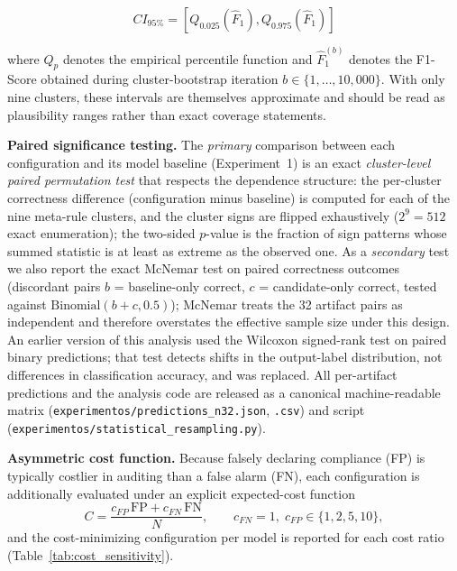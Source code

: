 \documentclass{ieeeaccess}
\begin{document}
\begin{equation}
CI_{95\%} = \left[
Q_{0.025}(\hat{F}_1),
Q_{0.975}(\hat{F}_1)
\right]
\label{eq:bootstrap_ci}
\end{equation}

where $Q_p$ denotes the empirical percentile function and $\hat{F}_1^{(b)}$ denotes the F1-Score obtained during cluster-bootstrap iteration $b \in \{1,\dots,10{,}000\}$. With only nine clusters, these intervals are themselves approximate and should be read as plausibility ranges rather than exact coverage statements.

\textbf{Paired significance testing.} The \emph{primary} comparison between each configuration and its model baseline (Experiment~1) is an exact \emph{cluster-level paired permutation test} that respects the dependence structure: the per-cluster correctness difference (configuration minus baseline) is computed for each of the nine meta-rule clusters, and the cluster signs are flipped exhaustively ($2^9=512$ exact enumeration); the two-sided $p$-value is the fraction of sign patterns whose summed statistic is at least as extreme as the observed one. As a \emph{secondary} test we also report the exact McNemar test on paired correctness outcomes (discordant pairs $b$ = baseline-only correct, $c$ = candidate-only correct, tested against $\mathrm{Binomial}(b+c, 0.5)$); McNemar treats the 32 artifact pairs as independent and therefore overstates the effective sample size under this design. An earlier version of this analysis used the Wilcoxon signed-rank test on paired binary predictions; that test detects shifts in the output-label distribution, not differences in classification accuracy, and was replaced. All per-artifact predictions and the analysis code are released as a canonical machine-readable matrix (\texttt{experimentos/predictions\_n32.json}, \texttt{.csv}) and script (\texttt{experimentos/statistical\_resampling.py}).

\textbf{Asymmetric cost function.} Because falsely declaring compliance (FP) is typically costlier in auditing than a false alarm (FN), each configuration is additionally evaluated under an explicit expected-cost function
\begin{equation}
C = \frac{c_{FP}\,\mathrm{FP} + c_{FN}\,\mathrm{FN}}{N}, \qquad c_{FN}=1,\; c_{FP}\in\{1,2,5,10\},
\label{eq:cost}
\end{equation}
and the cost-minimizing configuration per model is reported for each cost ratio (Table~\ref{tab:cost_sensitivity}).
\end{document}
